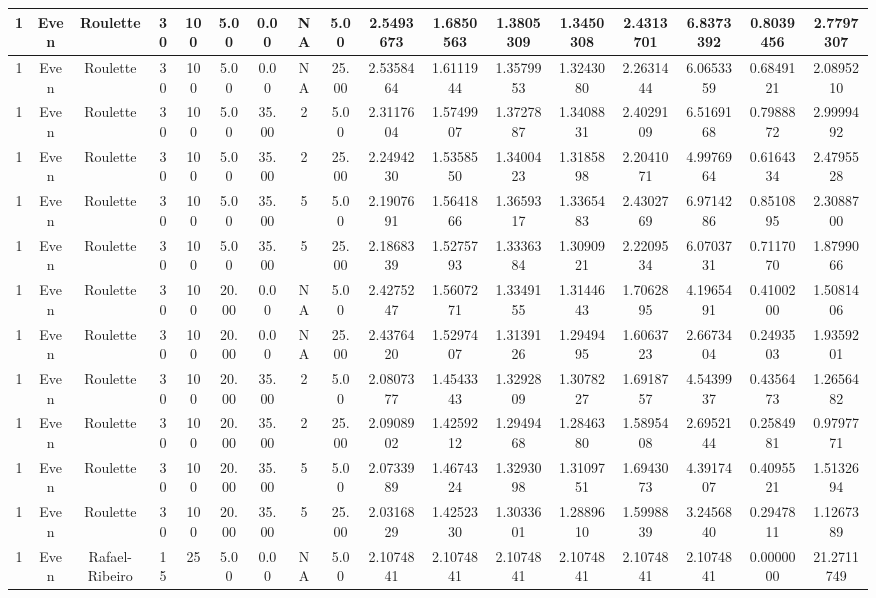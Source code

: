 \begin{longtable}{ | c | c | c | c | c | c | c | c | c | c | c | c | c | c | c | c | c | }
	\hline
	1	&	Even	&	Roulette	&	30	&	100	&	5.00	&	0.00	&	NA	&	5.00	&	2.5493673	&	1.6850563	&	1.3805309	&	1.3450308	&	2.4313701	&	6.8373392	&	0.8039456	&	2.7797307 \\
	\hline
	1	&	Even	&	Roulette	&	30	&	100	&	5.00	&	0.00	&	NA	&	25.00	&	2.5358464	&	1.6111944	&	1.3579953	&	1.3243080	&	2.2631444	&	6.0653359	&	0.6849121	&	2.0895210 \\
	\hline
	1	&	Even	&	Roulette	&	30	&	100	&	5.00	&	35.00	&	2	&	5.00	&	2.3117604	&	1.5749907	&	1.3727887	&	1.3408831	&	2.4029109	&	6.5169168	&	0.7988872	&	2.9999492 \\
	\hline
	1	&	Even	&	Roulette	&	30	&	100	&	5.00	&	35.00	&	2	&	25.00	&	2.2494230	&	1.5358550	&	1.3400423	&	1.3185898	&	2.2041071	&	4.9976964	&	0.6164334	&	2.4795528 \\
	\hline
	1	&	Even	&	Roulette	&	30	&	100	&	5.00	&	35.00	&	5	&	5.00	&	2.1907691	&	1.5641866	&	1.3659317	&	1.3365483	&	2.4302769	&	6.9714286	&	0.8510895	&	2.3088700 \\
	\hline
	1	&	Even	&	Roulette	&	30	&	100	&	5.00	&	35.00	&	5	&	25.00	&	2.1868339	&	1.5275793	&	1.3336384	&	1.3090921	&	2.2209534	&	6.0703731	&	0.7117070	&	1.8799066 \\
	\hline
	1	&	Even	&	Roulette	&	30	&	100	&	20.00	&	0.00	&	NA	&	5.00	&	2.4275247	&	1.5607271	&	1.3349155	&	1.3144643	&	1.7062895	&	4.1965491	&	0.4100200	&	1.5081406 \\
	\hline
	1	&	Even	&	Roulette	&	30	&	100	&	20.00	&	0.00	&	NA	&	25.00	&	2.4376420	&	1.5297407	&	1.3139126	&	1.2949495	&	1.6063723	&	2.6673404	&	0.2493503	&	1.9359201 \\
	\hline
	1	&	Even	&	Roulette	&	30	&	100	&	20.00	&	35.00	&	2	&	5.00	&	2.0807377	&	1.4543343	&	1.3292809	&	1.3078227	&	1.6918757	&	4.5439937	&	0.4356473	&	1.2656482 \\
	\hline
	1	&	Even	&	Roulette	&	30	&	100	&	20.00	&	35.00	&	2	&	25.00	&	2.0908902	&	1.4259212	&	1.2949468	&	1.2846380	&	1.5895408	&	2.6952144	&	0.2584981	&	0.9797771 \\
	\hline
	1	&	Even	&	Roulette	&	30	&	100	&	20.00	&	35.00	&	5	&	5.00	&	2.0733989	&	1.4674324	&	1.3293098	&	1.3109751	&	1.6943073	&	4.3917407	&	0.4095521	&	1.5132694 \\
	\hline
	1	&	Even	&	Roulette	&	30	&	100	&	20.00	&	35.00	&	5	&	25.00	&	2.0316829	&	1.4252330	&	1.3033601	&	1.2889610	&	1.5998839	&	3.2456840	&	0.2947811	&	1.1267389 \\
	\hline
	1	&	Even	&	Rafael-Ribeiro	&	15	&	25	&	5.00	&	0.00	&	NA	&	5.00	&	2.1074841	&	2.1074841	&	2.1074841	&	2.1074841	&	2.1074841	&	2.1074841	&	0.0000000	&	21.2711749 \\

\end{longtable}
